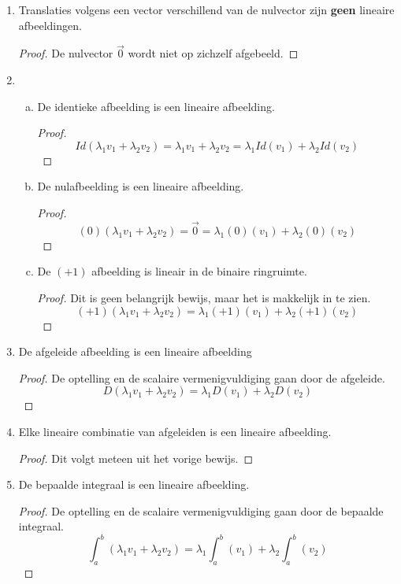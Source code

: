 \documentclass[lineaire_algebra_oplossingen.tex]{subfiles}
\begin{document}
\begin{enumerate}
\item Translaties volgens een vector verschillend van de nulvector zijn \textbf{geen} lineaire afbeeldingen.
\begin{proof}
De nulvector $\vec{0}$ wordt niet op zichzelf afgebeeld.
\end{proof}

\item
\begin{enumerate}[a)]
\item De identieke afbeelding is een lineaire afbeelding.
\begin{proof}
\[
Id(\lambda_1v_1+\lambda_2v_2) = \lambda_1v_1+\lambda_2v_2 = \lambda_1Id(v_1)+\lambda_2Id(v_2)
\]
\end{proof}

\item De nulafbeelding is een lineaire afbeelding.
\begin{proof}
\[
(0)(\lambda_1v_1+\lambda_2v_2) = \vec{0} = \lambda_1(0)(v_1)+\lambda_2(0)(v_2)
\]
\end{proof}

\item De $(+1)$ afbeelding is lineair in de binaire ringruimte.
\begin{proof}
Dit is geen belangrijk bewijs, maar het is makkelijk in te zien.
\[
(+1)(\lambda_1v_1+\lambda_2v_2) = \lambda_1(+1)(v_1)+\lambda_2(+1)(v_2)
\]
\end{proof}
\end{enumerate}

\item De afgeleide afbeelding is een lineaire afbeelding
\begin{proof}
De optelling en de scalaire vermenigvuldiging gaan door de afgeleide.
\[
D(\lambda_1v_1+\lambda_2v_2) = \lambda_1D(v_1)+\lambda_2D(v_2)
\]
\end{proof}

\item Elke lineaire combinatie van afgeleiden is een lineaire afbeelding.
\begin{proof}
Dit volgt meteen uit het vorige bewijs.
\end{proof}

\item De bepaalde integraal is een lineaire afbeelding.
\begin{proof}
De optelling en de scalaire vermenigvuldiging gaan door de bepaalde integraal.
\[
\int_a^b(\lambda_1v_1+\lambda_2v_2) = \lambda_1\int_a^b(v_1)+\lambda_2\int_a^b(v_2)
\]
\end{proof}


\end{enumerate}
\end{document}
